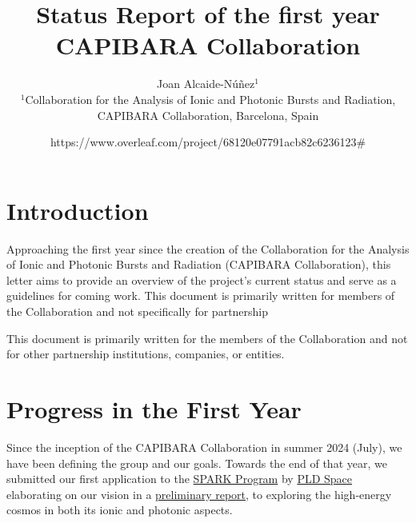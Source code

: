 \documentclass[arxiv,usenatbib]{iupartex}
\title[Status Report of Year 1 of the CAPIBARA Collaboration]{Status Report of the first year CAPIBARA Collaboration}
\author[Y1 CAPIBARA Status Report]{%
Joan Alcaide-Núñez$^{1}$ \orcid{0009-0009-2859-0974}
\affsep \\
$^1$Collaboration for the Analysis of Ionic and Photonic Bursts and Radiation, CAPIBARA Collaboration, Barcelona, Spain
}
\date{https://www.overleaf.com/project/68120e07791acb82c6236123#
	\pSubmit{00.00.0000} 
	\pRevReq{00.00.0000}
	\pLastRevRec{00.00.0000}
	\pAccept{00.00.0000}
	\pPubOnl{00.00.0000}
}
\begin{document}
\label{firstpage}
\pagerange{\pageref*{firstpage}--\pageref*{lastpage}}
\maketitle





\vspace{0.5cm}
\section{Introduction}
Approaching the first year since the creation of the Collaboration for the Analysis of Ionic and Photonic Bursts and Radiation (CAPIBARA Collaboration), this letter aims to provide an overview of the project's current status and serve as a guidelines for coming work. This document is primarily written for members of the Collaboration and not specifically for partnership

This document is primarily written for the members of the Collaboration and not for other partnership institutions, companies, or entities.

\section{Progress in the First Year}
Since the inception of the CAPIBARA Collaboration in summer 2024 (July), we have been defining the group and our goals. Towards the end of that year, we submitted our first application to the \href{https://spark-program.pldspace.com}{SPARK Program} by \href{https://pldspace.com}{PLD Space} elaborating on our vision in a \href{https://capibara3.github.io/files/preliminar_proposal.pdf}{preliminary report}, to exploring the high-energy cosmos in both its ionic and photonic aspects.
\end{document}
